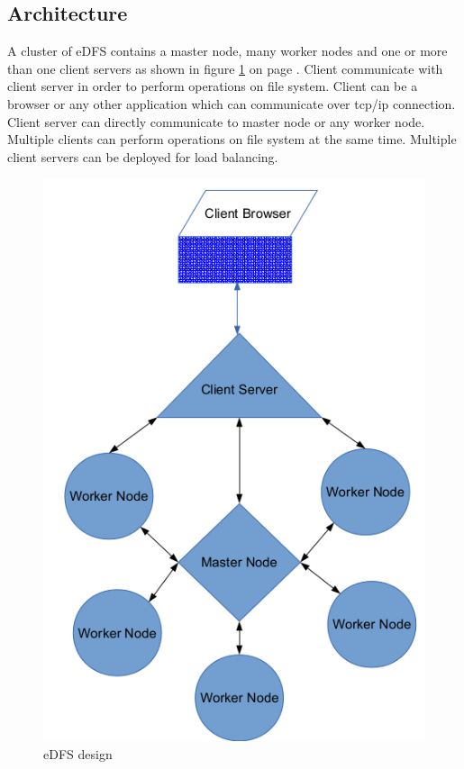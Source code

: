 \documentclass[a4paper,12pt]{article}
\begin{document}
\subsection{Architecture}
A cluster of eDFS contains a master node, many worker nodes and one or more than one client servers as shown in figure \ref{edfs_design} on page \pageref{edfs_design}. Client communicate with client server in order to perform operations on file system. Client can be a browser or any other application which can communicate over tcp/ip connection. Client server can directly communicate to master node or any worker node. Multiple clients can perform operations on file system at the same time. Multiple client servers can be deployed for load balancing.
\begin{figure}[h]
  \begin{center}
    \includegraphics[scale = 0.5]{images/design}
  \end{center}
  \caption{eDFS design}
  \label{edfs_design}
\end{figure}
\end{document}
